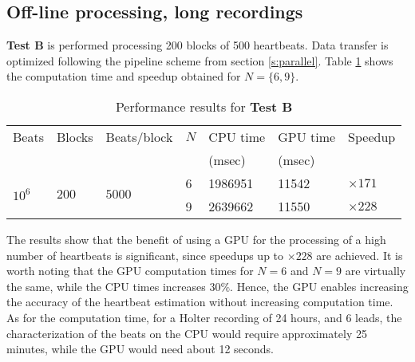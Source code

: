 \documentclass[runningheads]{llncs}
\begin{document}
\subsection{Off-line processing, long recordings}\label{ss:offlinelong}
\textbf{Test B} is performed processing 200 blocks of 500 heartbeats. Data transfer is optimized following the pipeline scheme from section \ref{s:parallel}. Table \ref{tab:B} shows the computation time and speedup obtained for $N=\{6,9\}$. 


\begin{table}[h]
\caption{Performance results for \textbf{Test B}}\label{tab:B}
\begin{minipage}[b]{\columnwidth}\centering
\renewcommand{\arraystretch}{1.2}
\begin{center}
\begin{tabular}{p{1 cm} p{1 cm} p{2 cm} p{1 cm} p{2 cm} p{2 cm} p{1 cm}}
Beats & Blocks & Beats/block & $N$ & CPU time & GPU time & Speedup\\
      & & &     & (msec) & (msec) & \\\hline
\multirow{2}{*}{$10^6$} & \multirow{2}{*}{$200$} & \multirow{2}{*}{$5000$} & 6 & 1986951 & 11542 & $\times 171$ \\
& & & 9 & 2639662 & 11550 & $\times 228$ \\
\end{tabular}
\end{center}
\end{minipage}
\end{table}

The results show that the benefit of using a GPU for the processing of a high number of heartbeats is significant, since speedups up to $\times 228$ are achieved. It is worth noting that the GPU  computation times for $N=6$ and $N=9$ are virtually the same, while the CPU times increases $30\%$. Hence, the GPU enables increasing the accuracy of the heartbeat estimation without increasing computation time. As for the computation time, for a Holter recording of 24 hours, and 6 leads, the characterization of the beats on the CPU would require approximately 25 minutes, while the GPU would need about 12 seconds.
\end{document}

